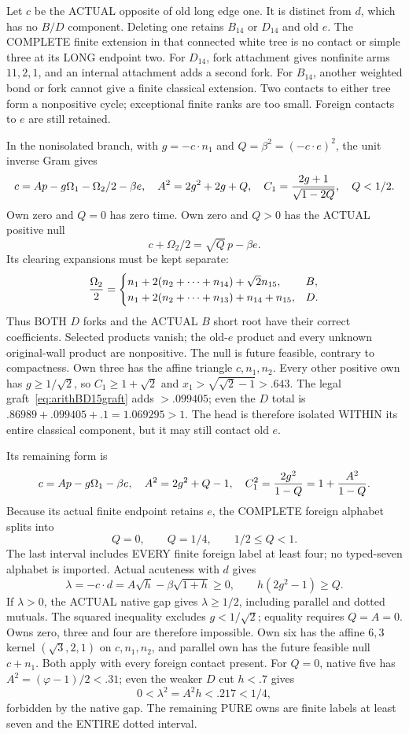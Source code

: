Let \(c\) be the ACTUAL opposite of old long edge one.
It is distinct from \(d\), which has no \(B/D\) component.
Deleting one retains \(B_{14}\) or \(D_{14}\) and old \(e\).
The COMPLETE finite extension in that connected white tree
is no contact or simple three at its LONG endpoint two.
For \(D_{14}\), fork attachment gives nonfinite arms
\(11,2,1\), and an internal attachment adds a second fork.
For \(B_{14}\), another weighted bond or fork cannot
give a finite classical extension.
Two contacts to either tree form a nonpositive cycle;
exceptional finite ranks are too small.
Foreign contacts to \(e\) are still retained.

In the nonisolated branch, with \(g=-c\cdot n_1\) and
\(Q=\beta^2=(-c\cdot e)^2\), the unit inverse Gram gives
\[
 c=Ap-g\Omega_1-\Omega_2/2-\beta e,\quad
 A^2=2g^2+2g+Q,\quad
 C_1={2g+1\over\sqrt{1-2Q}},\quad Q<1/2 .
\]
Own zero and \(Q=0\) has zero time.
Own zero and \(Q>0\) has the ACTUAL positive null
\[
                         c+\Omega_2/2=\sqrt Q\,p-\beta e .
\]
Its clearing expansions must be kept separate:
\[
 {\Omega_2\over2}=
 \begin{cases}
 n_1+2(n_2+\cdots+n_{14})+\sqrt2 n_{15},&B,\\
 n_1+2(n_2+\cdots+n_{13})+n_{14}+n_{15},&D .
 \end{cases}
\]
Thus BOTH \(D\) forks and the ACTUAL \(B\) short root
have their correct coefficients.
Selected products vanish; the old-\(e\) product and
every unknown original-wall product are nonpositive.
The null is future feasible, contrary to compactness.
Own three has the affine triangle \(c,n_1,n_2\).
Every other positive own has \(g\ge1/\sqrt2\), so
\(C_1\ge1+\sqrt2\) and
\(x_1>\sqrt{\sqrt2-1}>.643\).
The legal graft~\eqref{eq:arithBD15graft} adds \(>.099405\);
even the \(D\) total is
\(.86989+.099405+.1=1.069295>1\).
The head is therefore isolated WITHIN its entire
classical component, but it may still contact old \(e\).

Its remaining form is
\[
 c=Ap-g\Omega_1-\beta e,\quad
 A^2=2g^2+Q-1,\quad
 C_1^2={2g^2\over1-Q}=1+{A^2\over1-Q}.
\]
Because its actual finite endpoint retains \(e\),
the COMPLETE foreign alphabet splits into
\[
                   Q=0,\qquad Q=1/4,\qquad 1/2\le Q<1 .
\]
The last interval includes EVERY finite foreign label
at least four; no typed-seven alphabet is imported.
Actual acuteness with \(d\) gives
\[
 \lambda=-c\cdot d=A\sqrt h-\beta\sqrt{1+h}\ge0,
 \qquad h(2g^2-1)\ge Q .
\tag{R1N}\label{eq:arithBD15native}
\]
If \(\lambda>0\), the ACTUAL native gap gives
\(\lambda\ge1/2\), including parallel and dotted mutuals.
The squared inequality excludes \(g<1/\sqrt2\);
equality requires \(Q=A=0\).
Owns zero, three and four are therefore impossible.
Own six has the affine \(6,3\) kernel \((\sqrt3,2,1)\)
on \(c,n_1,n_2\), and parallel own has the future
feasible null \(c+n_1\).
Both apply with every foreign contact present.
For \(Q=0\), native five has
\(A^2=(\varphi-1)/2<.31\); even the weaker \(D\)
cut \(h<.7\) gives
\[
                         0<\lambda^2=A^2h<.217<1/4 ,
\]
forbidden by the native gap.
The remaining PURE owns are finite labels at least
seven and the ENTIRE dotted interval.

